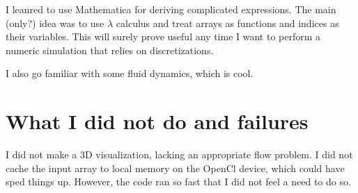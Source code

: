 \documentclass[paper=a4, fontsize=11pt]{scrartcl} %
\numberwithin{equation}{section} %
\numberwithin{figure}{section} %
\numberwithin{table}{section} %
\begin{document}
I leanred to use Mathematica for deriving complicated expressions. The main (only?) idea was to use $\lambda$ calculus
and treat arrays as functions and indices as their variables. This will surely prove useful any time I want to perform a numeric
simulation that relies on discretizations.

I also go familiar with some fluid dynamics, which is cool.

\section{What I did not do and failures}
I did not make a 3D visualization, lacking an appropriate flow problem. I did not cache the input array to local memory on the OpenCl device, which 
could have sped things up. However, the code ran so fast that I did not feel a need to do so.





\newpage
\end{document}
